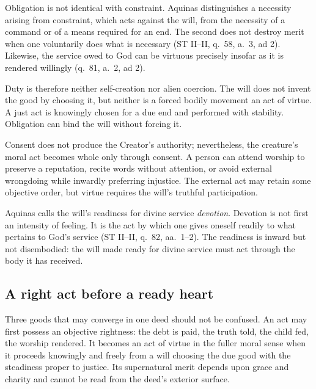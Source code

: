 Obligation is not identical with constraint. Aquinas distinguishes a necessity arising from constraint, which acts against the will, from the necessity of a command or of a means required for an end. The second does not destroy merit when one voluntarily does what is necessary (ST II--II, q.~58, a.~3, ad 2). Likewise, the service owed to God can be virtuous precisely insofar as it is rendered willingly (q.~81, a.~2, ad 2).

Duty is therefore neither self-creation nor alien coercion. The will does not invent the good by choosing it, but neither is a forced bodily movement an act of virtue. A just act is knowingly chosen for a due end and performed with stability. Obligation can bind the will without forcing it.

Consent does not produce the Creator's authority; nevertheless, the creature's moral act becomes whole only through consent. A person can attend worship to preserve a reputation, recite words without attention, or avoid external wrongdoing while inwardly preferring injustice. The external act may retain some objective order, but virtue requires the will's truthful participation.

Aquinas calls the will's readiness for divine service \emph{devotion}. Devotion is not first an intensity of feeling. It is the act by which one gives oneself readily to what pertains to God's service (ST II--II, q.~82, aa.~1--2). The readiness is inward but not disembodied: the will made ready for divine service must act through the body it has received.

\subsection{A right act before a ready heart}

Three goods that may converge in one deed should not be confused. An act may first possess an objective rightness: the debt is paid, the truth told, the child fed, the worship rendered. It becomes an act of virtue in the fuller moral sense when it proceeds knowingly and freely from a will choosing the due good with the steadiness proper to justice. Its supernatural merit depends upon grace and charity and cannot be read from the deed's exterior surface.

